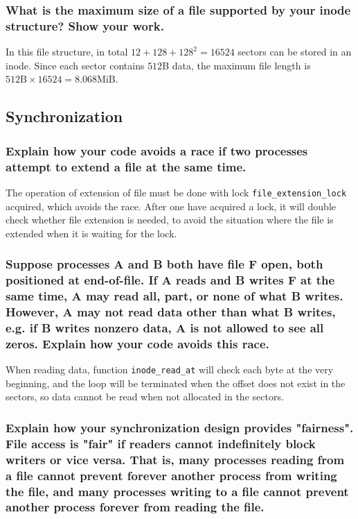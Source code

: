 \documentclass[sigconf, nonacm, balance=false, urlbreakonhyphens=true]{acmart}
\begin{document}
            \subsubsection{What is the maximum size of a file supported by your inode structure?  Show your work. }

                In this file structure, in total $12 + 128 + 128^2 = 16524$ sectors can be stored in an inode. Since each sector contains $512$B data, the maximum file length is $512\text{B} \times 16524 = 8.068\text{MiB}$. 
        
        \subsection{Synchronization}

            \subsubsection{Explain how your code avoids a race if two processes attempt to extend a file at the same time. }

                The operation of extension of file must be done with lock \texttt{file\_extension\_lock} acquired, which avoids the race. After one have acquired a lock, it will double check whether file extension is needed, to avoid the situation where the file is extended when it is waiting for the lock. 

            \subsubsection{Suppose processes A and B both have file F open, both positioned at end-of-file.  If A reads and B writes F at the same time, A may read all, part, or none of what B writes.  However, A may not read data other than what B writes, e.g. if B writes nonzero data, A is not allowed to see all zeros.  Explain how your code avoids this race. }

                When reading data, function \texttt{inode\_read\_at} will check each byte at the very beginning, and the loop will be terminated when the offset does not exist in the sectors, so data cannot be read when not allocated in the sectors. 

            \subsubsection{Explain how your synchronization design provides "fairness".  File access is "fair" if readers cannot indefinitely block writers or vice versa.  That is, many processes reading from a file cannot prevent forever another process from writing the file, and many processes writing to a file cannot prevent another process forever from reading the file. }
\end{document}
